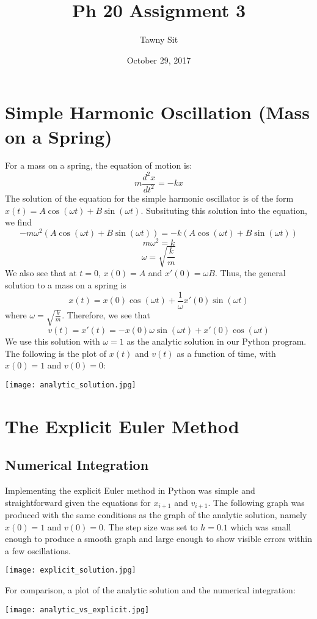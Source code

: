 \documentclass{article}
\title{Ph 20 Assignment 3}
\author{Tawny Sit}
\date{October 29, 2017}
\begin{document}
\maketitle

\section{Simple Harmonic Oscillation (Mass on a Spring)}
For a mass on a spring, the equation of motion is:
$$  m\frac{d^2x}{dt^2} = -kx $$
The solution of the equation for the simple harmonic oscillator is of the form $x(t) = A\cos(\omega t) + B\sin(\omega t)$. Subsituting this solution into the equation, we find
$$ -m\omega^2(A\cos(\omega t) + B\sin(\omega t)) = -k(A\cos(\omega t) + B\sin(\omega t)) $$
$$ m\omega^2 = k $$
$$ \omega = \sqrt{\frac{k}{m}}$$
We also see that at $t=0$, $x(0) = A$ and $x'(0) = \omega B$. Thus, the general solution to a mass on a spring is
$$ x(t) = x(0)\cos(\omega t) + \frac{1}{\omega}x'(0)\sin(\omega t) $$
where $\omega = \sqrt{\frac{k}{m}}$. Therefore, we see that
$$v(t) = x'(t) = -x(0)\omega\sin(\omega t) + x'(0)\cos(\omega t)$$
We use this solution with $ \omega = 1 $ as the analytic solution in our Python program. The following is the plot of $x(t)$ and $v(t)$ as a function of time, with $ x(0) = 1 $ and $ v(0) = 0 $:

\texttt{[image: analytic\_solution.jpg]}

\section{The Explicit Euler Method}

\subsection{Numerical Integration}
Implementing the explicit Euler method in Python was simple and straightforward given the equations for $x_{i+1}$ and $v_{i+1}$. The following graph was produced with the same conditions as the graph of the analytic solution, namely $ x(0) = 1 $ and $ v(0) = 0 $. The step size was set to $ h = 0.1 $ which was small enough to produce a smooth graph and large enough to show visible errors within a few oscillations.

\texttt{[image: explicit\_solution.jpg]}

For comparison, a plot of the analytic solution and the numerical integration:

\texttt{[image: analytic\_vs\_explicit.jpg]}
\end{document}
